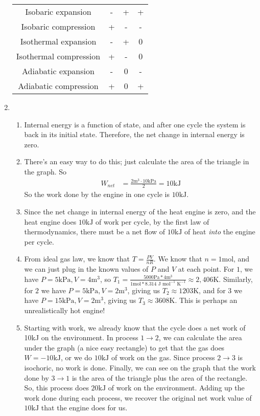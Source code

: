 \begin{enumerate}
\begin{center}
\begin{tabular}{|c| c | c | c|}
 Isobaric expansion & - & + & + \\
 Isobaric compression & + & - & - \\
 Isothermal expansion & - & + & 0 \\
 Isothermal compression & + & - & 0 \\
 Adiabatic expansion & - & 0 & - \\
 Adiabatic compression & + & 0 & + \\
 \hline
 \end{tabular}
 \end{center}
    \item 
    \begin{enumerate}
        \item Internal energy is a function of state, and after one cycle the system is back in its initial state. Therefore, the net change in internal energy is zero.
        \item There's an easy way to do this; just calculate the area of the triangle in the graph. So
        \begin{align*}
            W_{net} &= \frac{2\textrm{m}^3\cdot 10\textrm{kPa}}{2}
            = 10\textrm{kJ}
        \end{align*}
        So the work done by the engine in one cycle is $10\textrm{kJ}$. 
        \item Since the net change in internal energy of the heat engine is zero, and the heat engine does $10\textrm{kJ}$ of work per cycle, by the first law of thermodynamics, there must be a net flow of $10\textrm{kJ}$ of heat \textit{into} the engine per cycle.
        \item From ideal gas law, we know that $T = \frac{PV}{nR}$. We know that $n=1\textrm{mol}$, and we can just plug in the known values of $P$ and $V$ at each point. For $1$, we have $P = 5\textrm{kPa}, V = 4\textrm{m}^3$, so $T_1 = \frac{5000\textrm{Pa}*4\textrm{m}^3}{1\textrm{mol}*8.314\textrm{ J} \textrm{ mol}^{-1} \textrm{ K}^{-1}} \approx 2,406 \textrm{K}$. Similarly, for $2$ we have $P = 5\textrm{kPa}, V = 2\textrm{m}^3$, giving us $T_2 \approx 1203\textrm{K}$, and for $3$ we have $P = 15\textrm{kPa}, V = 2\textrm{m}^3$, giving us $T_3 \approx 3608\textrm{K}$. This is perhaps an unrealistically hot engine!
        \item Starting with work, we already know that the cycle does a net work of 10kJ on the environment. In process $1 \rightarrow 2$, we can calculate the area under the graph (a nice easy rectangle) to get that the gas does $W = -10\textrm{kJ}$, or we do $10\textrm{kJ}$ of work on the gas. Since process $2 \rightarrow 3$ is isochoric, no work is done. Finally, we can see on the graph that the work done by $3 \rightarrow 1$ is the area of the triangle plus the area of the rectangle. So, this process does $20\textrm{kJ}$ of work on the environment. Adding up the work done during each process, we recover the original net work value of $10\textrm{kJ}$ that the engine does for us. \\

\end{enumerate}
\end{enumerate}
